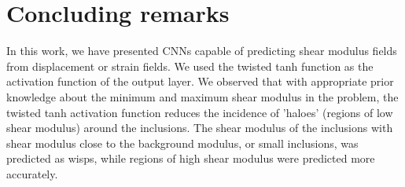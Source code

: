 \documentclass[10pt]{article}
\begin{document}
\section{Concluding remarks}
In this work, we have presented CNNs capable of predicting shear modulus fields from displacement or strain fields. We used the twisted tanh function as the activation function of the output layer. We observed that with appropriate prior knowledge about the minimum and maximum shear modulus in the problem, the twisted tanh activation function reduces the incidence of 'haloes' (regions of low shear modulus) around the inclusions. The shear modulus of the inclusions with shear modulus close to the background modulus, or small inclusions, was predicted as wisps, while regions of high shear modulus were predicted more accurately.    
\end{document}
